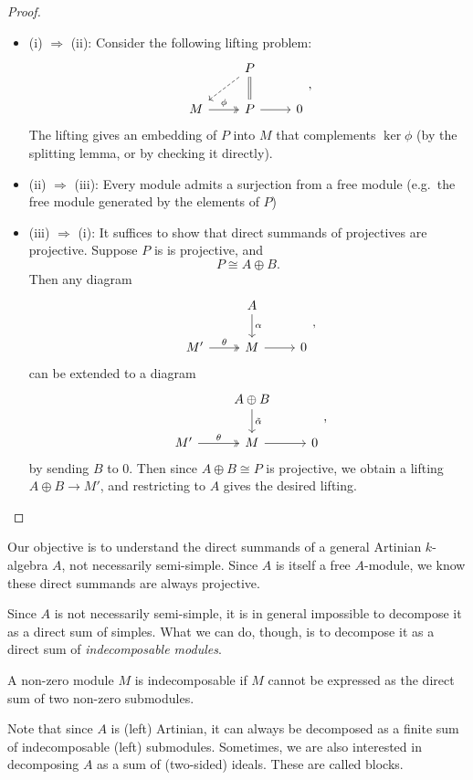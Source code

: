 \documentclass[a4paper]{article}
\begin{document}
\begin{proof}\leavevmode
  \begin{itemize}
    \item (i) $\Rightarrow$ (ii): Consider the following lifting problem:
      \[
        \begin{tikzcd}
          & P \ar[d, equals] \ar[dl, dashed]\\
          M \ar[r, two heads, "\phi"] & P \ar[r] & 0
        \end{tikzcd},
      \]
      The lifting gives an embedding of $P$ into $M$ that complements $\ker \phi$ (by the splitting lemma, or by checking it directly).
    \item (ii) $\Rightarrow$ (iii): Every module admits a surjection from a free module (e.g.\ the free module generated by the elements of $P$)
    \item (iii) $\Rightarrow$ (i): It suffices to show that direct summands of projectives are projective. Suppose $P$ is is projective, and
      \[
        P \cong A \oplus B.
      \]
      Then any diagram
      \[
        \begin{tikzcd}
          & A \ar[d, "\alpha"]\\
          M' \ar[r, two heads, "\theta"] & M \ar[r] & 0
        \end{tikzcd},
      \]
      can be extended to a diagram
      \[
        \begin{tikzcd}
          & A \oplus B \ar[d, "\tilde{\alpha}"]\\
          M' \ar[r, two heads, "\theta"] & M \ar[r] & 0
        \end{tikzcd},
      \]
      by sending $B$ to $0$. Then since $A \oplus B \cong P$ is projective, we obtain a lifting $A \oplus B \to M'$, and restricting to $A$ gives the desired lifting.
  \end{itemize}
\end{proof}

Our objective is to understand the direct summands of a general Artinian $k$-algebra $A$, not necessarily semi-simple. Since $A$ is itself a free $A$-module, we know these direct summands are always projective.

Since $A$ is not necessarily semi-simple, it is in general impossible to decompose it as a direct sum of simples. What we can do, though, is to decompose it as a direct sum of \emph{indecomposable modules}.

\begin{defi}[Indecomposable]
  A non-zero module $M$ is indecomposable if $M$ cannot be expressed as the direct sum of two non-zero submodules.
\end{defi}
Note that since $A$ is (left) Artinian, it can always be decomposed as a finite sum of indecomposable (left) submodules. Sometimes, we are also interested in decomposing $A$ as a sum of (two-sided) ideals. These are called blocks.
\end{document}
